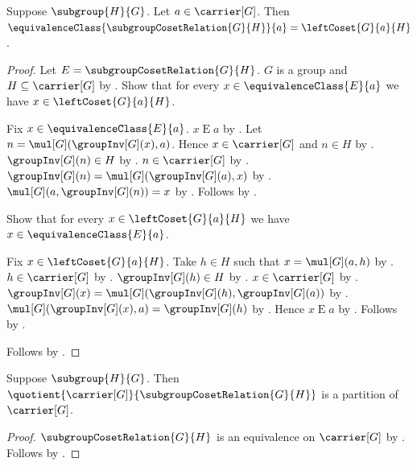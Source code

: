 \begin{theorem}\label{subgroup_coset_equivalence_class}
    Suppose $\subgroup{H}{G}$.
    Let $a\in\carrier[G]$.
    Then
        $\equivalenceClass{\subgroupCosetRelation{G}{H}}{a}
            =\leftCoset{G}{a}{H}$.
\end{theorem}
\begin{proof}
    Let $E=\subgroupCosetRelation{G}{H}$.
    $G$ is a group and $H\subseteq\carrier[G]$ by
        .
    Show that for every $x\in\equivalenceClass{E}{a}$ we have
        $x\in\leftCoset{G}{a}{H}$.
    \begin{subproof}
        Fix $x\in\equivalenceClass{E}{a}$.
        $x\mathrel{E}a$ by .
        Let $n=\mul[G](\groupInv[G](x),a)$.
        Hence $x\in\carrier[G]$ and
            $n\in H$ by
            .
        $\groupInv[G](n)\in H$ by .
        $n\in\carrier[G]$ by .
        $\groupInv[G](n)=
            \mul[G](\groupInv[G](a),x)$ by
            .
        $\mul[G](a,\groupInv[G](n))=x$ by
            .
        Follows by .
    \end{subproof}
    Show that for every $x\in\leftCoset{G}{a}{H}$ we have
        $x\in\equivalenceClass{E}{a}$.
    \begin{subproof}
        Fix $x\in\leftCoset{G}{a}{H}$.
        Take $h\in H$ such that $x=\mul[G](a,h)$ by
            .
        $h\in\carrier[G]$ by .
        $\groupInv[G](h)\in H$ by .
        $x\in\carrier[G]$ by .
        $\groupInv[G](x)=
            \mul[G](\groupInv[G](h),\groupInv[G](a))$ by
            .
        $\mul[G](\groupInv[G](x),a)=\groupInv[G](h)$ by
            .
        Hence $x\mathrel{E}a$ by
            .
        Follows by .
    \end{subproof}
    Follows by .
\end{proof}

\begin{theorem}\label{left_cosets_partition}
    Suppose $\subgroup{H}{G}$.
    Then
        $\quotient{\carrier[G]}{\subgroupCosetRelation{G}{H}}$
        is a partition of $\carrier[G]$.
\end{theorem}
\begin{proof}
    $\subgroupCosetRelation{G}{H}$ is an equivalence on
        $\carrier[G]$ by .
    Follows by .
\end{proof}

